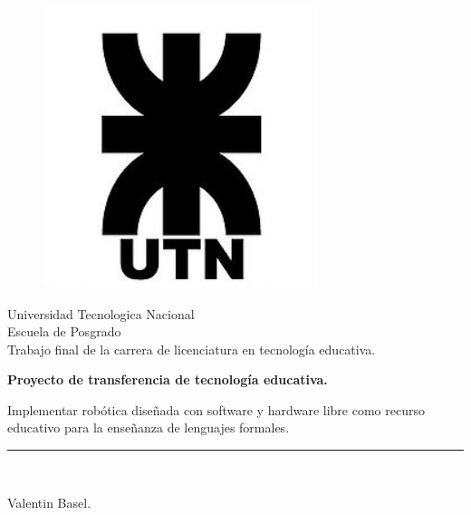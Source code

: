\begin{titlepage}

\begin{center}
\vspace*{-1in}
\begin{figure}[htb]
\begin{center}
\includegraphics[width=8cm]{./figuras/utn_logo.jpg}
\end{center}
\end{figure}

Universidad Tecnologica Nacional\\
\vspace*{0.15in}
Escuela de Posgrado \\
\vspace*{0.6in}
Trabajo final de la carrera de licenciatura en tecnología educativa.\\
\vspace*{0.2in}
\begin{Large}
\textbf{Proyecto de transferencia de tecnología educativa.}
\end{Large}
\vspace*{0.3in}
\begin{large}

Implementar robótica diseñada con software y hardware libre como recurso educativo para la enseñanza de lenguajes formales.

\end{large}
\vspace*{0.3in}
\rule{80mm}{0.1mm}\\
\vspace*{0.1in}
\begin{large}
Valentin Basel.
\end{large}
\end{center}

\end{titlepage}
\newpage
$\ $
\thispagestyle{empty} %
